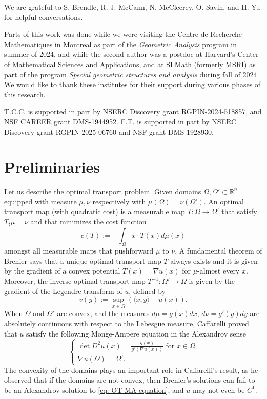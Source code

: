\documentclass[12pt,reqno]{amsart}
\numberwithin{equation}{section}
\begin{document}
\bigskip

 We are grateful to S. Brendle, R. J. McCann, N. McCleerey, O. Savin, and H. Yu for helpful conversations. 

Parts of this work was done while we were visiting the Centre de Recherche Mathematiques in Montreal as part of the {\em Geometric Analysis} program in summer of 2024, and while the second author was a postdoc at Harvard's Center of Mathematical Sciences and Applications, and at SLMath (formerly MSRI) as part of the program {\em Special geometric structures and analysis} during fall of 2024. We would like to thank these institutes for their support during various phases of this research. 

T.C.C. is supported in part by NSERC Discovery grant RGPIN-2024-518857, and NSF CAREER grant DMS-1944952. F.T. is supported in part by NSERC Discovery grant RGPIN-2025-06760 and NSF grant DMS-1928930. 

\section{Preliminaries}\label{sec: preliminaries}
Let us describe the optimal transport problem. Given domains $\Omega, \Omega'\subset \mathbb R^n$ equipped with measure $\mu, \nu$ respectively with $\mu(\Omega) = \nu(\Omega')$. An optimal transport map (with quadratic cost) is a measurable map $T:\Omega\to \Omega'$ that satisfy $T_{\sharp}\mu = \nu$ and that minimizes the cost function 
\[c(T) := -\int_{\Omega}x\cdot T(x)d\mu(x)\]
amongst all measurable maps that pushforward $\mu$ to $\nu$. A fundamental theorem of Brenier \cite{Brenier} says that a unique optimal transport map $T$ always exists and it is given by the gradient of a convex potential $T(x) = \nabla u(x)$ for $\mu$-almost every $x$. Moreover, the inverse optimal transport map $T^{-1}:\Omega'\to \Omega$ is given by the gradient of the Legendre transform of $u$, defined by
\[v(y) := \sup_{x\in\Omega}(\langle x, y \rangle-u(x)). \] 
When $\Omega$ and $\Omega'$ are convex, and the measures $d\mu = g(x)dx$, $d\nu = g'(y)dy$ are absolutely continuous with respect to the Lebesgue measure, Caffarelli \cite{Caffarelli} proved that $u$ satisfy the following Monge-Ampere equation in the Alexandrov sense
\begin{equation}\label{eq: OT-MA-equation}
	\begin{cases}
		\det D^2u(x) = \frac{g(x)}{g'(\nabla u(x))} \text{ for }x\in \Omega\\
		\nabla u(\Omega) = \Omega'.
	\end{cases}
\end{equation}
The convexity of the domains plays an important role in Caffarelli's result, as he observed that if the domains are not convex, then Brenier's solutions can fail to be an Alexandrov solution to \eqref{eq: OT-MA-equation}, and $u$ may not even be $C^1$. 
\end{document}
